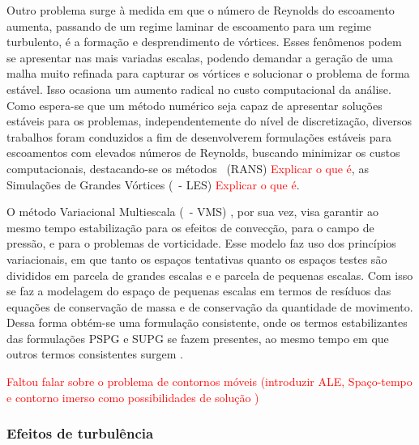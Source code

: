 Outro problema surge à medida em que o número de Reynolds do escoamento aumenta, passando de um regime laminar de escoamento para um regime turbulento, é a formação e desprendimento de vórtices. Esses fenômenos podem se apresentar nas mais variadas escalas, podendo demandar a geração de uma malha muito refinada para capturar os vórtices e solucionar o problema de forma estável. Isso ocasiona um aumento radical no custo computacional da análise. Como espera-se que um método numérico seja capaz de apresentar soluções estáveis para os problemas, independentemente do nível de discretização, diversos trabalhos foram conduzidos a fim de desenvolverem formulações estáveis para escoamentos com elevados números de Reynolds, buscando minimizar os custos computacionais, destacando-se  os métodos \RANS\ (RANS) \cite{speziale1991analytical,alfonsi2009reynolds,ling2015evaluation} \textcolor{red}{Explicar o que é}, as Simulações de Grandes Vórtices (\LES\ - LES) \cite{germano1991dynamic,piomelli1999large,hughes2000large,vsekutkovski2021partitioned} \textcolor{red}{Explicar o que é}.

O método Variacional Multiescala (\VMS\ - VMS) \cite{hughes1995multiscale,hughes1998variational,hughes2002variational,bazilevs2010large,bazilevs2013computational}, por sua vez, visa garantir ao mesmo tempo estabilização para os efeitos de convecção, para o campo de pressão, e para o problemas de vorticidade. Esse modelo faz uso dos princípios variacionais, em que tanto os espaços tentativas quanto os espaços testes são divididos em parcela de grandes escalas e e parcela de pequenas escalas. Com isso se faz a modelagem do espaço de pequenas escalas em termos de resíduos das equações de conservação de massa e de conservação da quantidade de movimento. Dessa forma obtém-se uma formulação consistente, onde os termos estabilizantes das formulações PSPG e SUPG se fazem presentes, ao mesmo tempo em que outros termos consistentes surgem \cite{bazilevs2013computational,sondak2015new}.

\textcolor{red}{Faltou falar sobre o problema de contornos móveis (introduzir ALE, Spaço-tempo e contorno imerso como possibilidades de solução )}

\subsubsection{Efeitos de turbulência} \label{MT}

